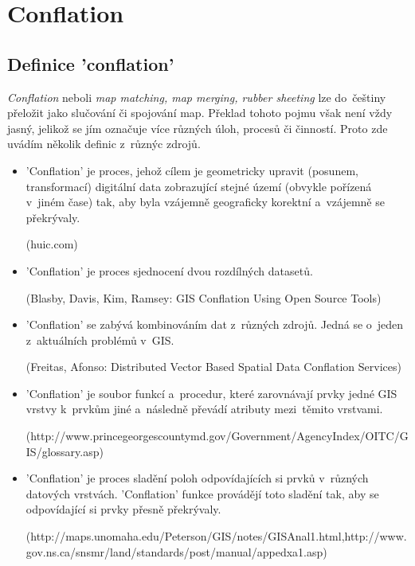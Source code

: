 \chapter{Conflation}
\label{2-conflation}

\section{Definice 'conflation'}
\label{definice}

\textit{Conflation} neboli \textit{map matching, map merging, rubber sheeting} lze do~češtiny přeložit jako slučování či spojování map. Překlad tohoto pojmu však není vždy 
jasný, jelikož se jím označuje více různých úloh, procesů či činností. Proto zde uvádím několik definic z~různýc zdrojů. 

\begin{itemize}
 \item 'Conflation' je proces, jehož cílem je geometricky upravit (posunem, transformací) digitální data zobrazující stejné území (obvykle pořízená v~jiném čase) tak, aby byla 
    vzájemně geograficky korektní a~vzájemně se překrývaly. %
    
    (huic.com)

  \item 'Conflation' je proces sjednocení dvou rozdílných datasetů.
    
    (Blasby, Davis, Kim, Ramsey: GIS Conflation Using Open Source Tools)

  \item 'Conflation' se zabývá kombinováním dat z~různých zdrojů. Jedná se o~jeden z~aktuálních problémů v~GIS.
   
    (Freitas, Afonso: Distributed Vector Based Spatial Data Conflation Services)

  \item 'Conflation' je soubor funkcí a~procedur, které zarovnávají prvky jedné GIS vrstvy k~prvkům jiné a~následně převádí atributy mezi~těmito vrstvami.
   
    (http://www.princegeorgescountymd.gov/Government/AgencyIndex/\newline OITC/GIS/glossary.asp)

  \item 'Conflation' je proces sladění poloh odpovídajících si prvků v~různých datových vrstvách. 'Conflation' funkce provádějí toto sladění tak, aby se odpovídající si prvky
    přesně překrývaly. 
    
    (http://maps.unomaha.edu/Peterson/GIS/notes/GISAnal1.html,\newline http://www.gov.ns.ca/snsmr/land/standards/post/manual/appedxa1.asp)


\end{itemize}
